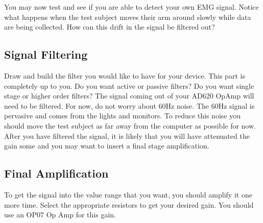 \documentclass{article}
\begin{document}
You may now test and see if you are able to detect your own EMG signal. Notice what happens when the test subject moves their arm around slowly while data are being collected. How can this drift in the signal be filtered out?

\subsection*{Signal Filtering}
Draw and build the filter you would like to have for your device. This part is completely up to you. Do you want active or passive filters? Do you want single stage or higher order filters? The signal coming out of your AD620 OpAmp will need to be filtered. For now, do not worry about 60Hz noise. The 60Hz signal is pervasive and comes from the lights and monitors. To reduce this noise you should move the test subject as far away from the computer as possible for now.\\

After you have filtered the signal, it is likely that you will have attenuated the gain some and you may want to insert a final stage amplification.

\subsection*{Final Amplification}
To get the signal into the value range that you want, you should amplify it one more time. Select the appropriate resistors to get your desired gain. You should use an OP07 Op Amp for this gain.
\end{document}
